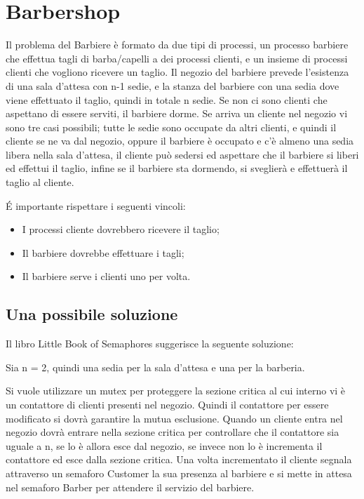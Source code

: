 \section{Barbershop}
Il problema del Barbiere è formato da due tipi di processi, un processo barbiere che effettua tagli di barba/capelli a dei processi clienti, e un insieme di processi clienti che vogliono ricevere un taglio. Il negozio del barbiere prevede l'esistenza di una sala d'attesa con n-1 sedie, e la stanza del barbiere con una sedia dove viene effettuato il taglio, quindi in totale n sedie. Se non ci sono clienti che aspettano di essere serviti, il barbiere dorme. Se arriva un cliente nel negozio vi sono tre casi possibili; tutte le sedie sono occupate da altri clienti, e quindi il cliente se ne va dal negozio, oppure il barbiere è occupato e c'è almeno una sedia libera nella sala d'attesa, il cliente può sedersi ed aspettare che il barbiere si liberi ed effettui il taglio, infine se il barbiere sta dormendo, si sveglierà e effettuerà il taglio al cliente.

É importante rispettare i seguenti vincoli:

\begin{itemize}
	\item I processi cliente dovrebbero ricevere il taglio;
	\item Il barbiere dovrebbe effettuare i tagli;
	\item Il barbiere serve i clienti uno per volta.
	
\end{itemize}

\subsection{Una possibile soluzione}
Il libro Little Book of Semaphores suggerisce la seguente soluzione: 

Sia n = 2, quindi una sedia per la sala d'attesa e una per la barberia. 

Si vuole utilizzare un \textsf{mutex} per proteggere la sezione critica al cui interno vi è un contattore di clienti presenti nel negozio. Quindi il contattore per essere modificato si dovrà garantire la mutua esclusione. Quando un cliente entra nel negozio dovrà entrare nella sezione critica per controllare che il contattore sia uguale a n, se lo è allora esce dal negozio, se invece non lo è incrementa il contattore ed esce dalla sezione critica. Una volta incrementato il cliente segnala attraverso un semaforo \textsf{Customer} la sua presenza al barbiere e si mette in attesa nel semaforo \textsf{Barber} per attendere il servizio del barbiere.

